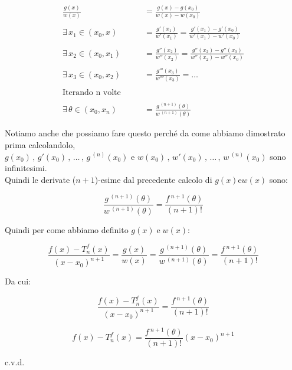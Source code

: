 \documentclass[../dimostrazioni]{subfiles}
\begin{document}
            \begin{align*}
                \frac{g(x)}{w(x)} &= \frac{g(x) - g(x_0)}{w(x) - w(x_0)}\\
                \\
                \exists \, x_1 \in (x_0, x) \qquad &= \frac{g'(x_1)}{w'(x_1)} = \frac{g'(x_1) - g'(x_0)}{w'(x_1) - w'(x_0)}\\
                \\
                \exists \, x_2 \in (x_0, x_1) \qquad &= \frac{g''(x_2)}{w''(x_2)} = \frac{g''(x_2) - g''(x_0)}{w''(x_2) - w''(x_0)}\\
                \\
                \exists \, x_3 \in (x_0, x_2) \qquad &= \frac{g'''(x_3)}{w'''(x_3)} = \dots\\
                \\
                \text{Iterando n volte}\\
                \\
                \exists \, \theta \in (x_0, x_n) \qquad &= \frac{g\,^{(n+1)}(\theta)}{w\,^{(n+1)}(\theta)}
            \end{align*}

            Notiamo anche che possiamo fare questo perché da come abbiamo dimostrato prima calcolandolo, \\ 
            \(g(x_0)\,,\, g'(x_0)\,,\, \dots\,,\, g\,^{(n)} (x_0) \) e \( w(x_0)\,,\, w'(x_0)\,,\, \dots\,,\, w\,^{(n)} (x_0)\) sono infinitesimi.\\

            Quindi le derivate (\(n+1\))-esime dal precedente calcolo di \(g(x) \text{e} w(x)\) sono:

            \[  \frac{g\,^{(n+1)}(\theta)}{w\,^{(n+1)}(\theta)} = \frac{f\,^{n+1}(\theta)}{(n+1)!} \]

            Quindi per come abbiamo definito \(g(x) \; \text{e} \; w(x)\):

            \[  \frac{f(x) - T _n ^ f (x)}{(x-x_0)^{n+1}} = \frac{g(x)}{w(x)} = \frac{g\,^{(n+1)}(\theta)}{w\,^{(n+1)}(\theta)} = \frac{f\,^{n+1}(\theta)}{(n+1)!}   \]

            Da cui:

            \[  \frac{f(x) - T _n ^ f (x)}{(x-x_0)^{n+1}} = \frac{f\,^{n+1}(\theta)}{(n+1)!}   \]

            \[  f(x) - T _n ^ f (x) = \frac{f\,^{n+1}(\theta)}{(n+1)!}(x-x_0)^{n+1} \]

            c.v.d.
        
\end{document}
